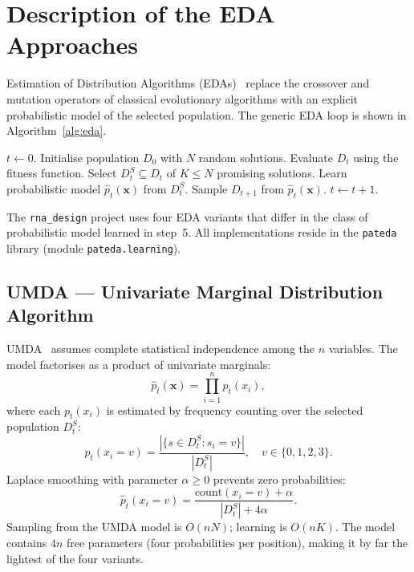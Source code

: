 \documentclass[11pt,a4paper]{article}
\begin{document}
\section{Description of the EDA Approaches}
\label{sec:edas}

Estimation of Distribution Algorithms (EDAs)~\cite{larranaga2002eda,
pelikan2002eda} replace the crossover and mutation operators of classical
evolutionary algorithms with an explicit probabilistic model of the selected
population. The generic EDA loop is shown in Algorithm~\ref{alg:eda}.

\begin{algorithm}[h]
\caption{Generic EDA}
\label{alg:eda}
\begin{algorithmic}[1]
\State $t \leftarrow 0$. Initialise population $D_0$ with $N$ random solutions.
\Repeat
  \State Evaluate $D_t$ using the fitness function.
  \State Select $D_t^S \subseteq D_t$ of $K \leq N$ promising solutions.
  \State Learn probabilistic model $\hat{p}_t(\mathbf{x})$ from $D_t^S$.
  \State Sample $D_{t+1}$ from $\hat{p}_t(\mathbf{x})$.
  \State $t \leftarrow t + 1$.
\end{algorithmic}
\end{algorithm}

The \texttt{rna\_design} project uses four EDA variants that differ in the
class of probabilistic model learned in step~5. All implementations reside
in the \texttt{pateda} library (module \texttt{pateda.learning}).

\subsection{UMDA — Univariate Marginal Distribution Algorithm}

UMDA~\cite{muhlenbein1997umda} assumes complete statistical independence
among the $n$ variables. The model factorises as a product of univariate
marginals:
\[
  \hat{p}_t(\mathbf{x}) = \prod_{i=1}^{n} p_t(x_i),
\]
where each $p_t(x_i)$ is estimated by frequency counting over the selected
population $D_t^S$:
\[
  p_t(x_i = v) = \frac{|\{s \in D_t^S : s_i = v\}|}{|D_t^S|},
  \quad v \in \{0,1,2,3\}.
\]
Laplace smoothing with parameter $\alpha \geq 0$ prevents zero probabilities:
\[
  \hat{p}_t(x_i = v) = \frac{\text{count}(x_i = v) + \alpha}{|D_t^S| + 4\alpha}.
\]
Sampling from the UMDA model is $O(nN)$; learning is $O(nK)$. The model
contains $4n$ free parameters (four probabilities per position), making it
by far the lightest of the four variants.
\end{document}

